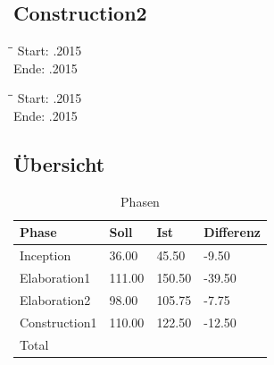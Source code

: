 \subsection{Construction2}
\begin{tabbing}[H]
    \hspace*{6cm}\=\hspace*{6cm}\= \kill
    Start: .2015 \\
	Ende: .2015 \\
\end{tabbing}


\begin{tabbing}[H]
    \hspace*{6cm}\=\hspace*{6cm}\= \kill
    Start: .2015 \\
	Ende: .2015 \\
\end{tabbing}

\subsection{Übersicht}
\begin{table}[H]
    \begin{tabular}{|p{5cm}|p{2cm}|p{2cm}|p{2cm}|}
    \hline    
    \rowcolor{lightblue}
	Phase & Soll & Ist & Differenz \\ \hline
	Inception & 36.00 &	45.50 &	-9.50 \\ \hline
	Elaboration1 & 111.00 & 150.50	& -39.50 \\ \hline
	Elaboration2 & 98.00 & 105.75 & -7.75 \\ \hline
	Construction1 & 110.00 & 122.50 & -12.50 \\ \hline
	\rowcolor{lightblue}
	Total & & & \\ \hline
    \end{tabular}
    \caption[Phasen]{Phasen}
\end{table}

